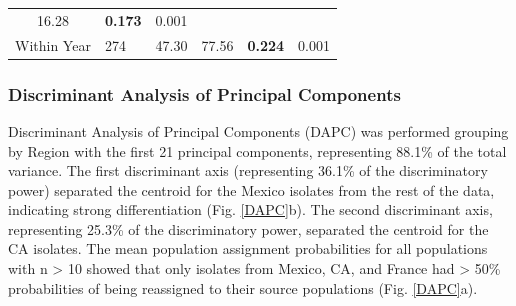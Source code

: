 \documentclass[fleqn,10pt,lineno]{wlpeerj} %
\theoremstyle{definition}
\theoremstyle{definition}
\theoremstyle{definition}
\theoremstyle{remark}
\begin{document}
\begin{longtable}[]{@{}clrllc@{}}
\begin{minipage}[t]{0.13\columnwidth}
16.28\strut
\end{minipage} & \begin{minipage}[t]{0.19\columnwidth}\raggedright\strut
\textbf{0.173}\strut
\end{minipage} & \begin{minipage}[t]{0.07\columnwidth}\centering\strut
0.001\strut
\end{minipage}\tabularnewline
\begin{minipage}[t]{0.32\columnwidth}\centering\strut
Within Year\strut
\end{minipage} & \begin{minipage}[t]{0.06\columnwidth}\raggedright\strut
274\strut
\end{minipage} & \begin{minipage}[t]{0.07\columnwidth}\raggedleft\strut
47.30\strut
\end{minipage} & \begin{minipage}[t]{0.13\columnwidth}\raggedright\strut
77.56\strut
\end{minipage} & \begin{minipage}[t]{0.19\columnwidth}\raggedright\strut
\textbf{0.224}\strut
\end{minipage} & \begin{minipage}[t]{0.07\columnwidth}\centering\strut
0.001\strut
\end{minipage}\tabularnewline
\bottomrule
\end{longtable}

\newpage

\subsubsection*{Discriminant Analysis of Principal
Components}\label{discriminant-analysis-of-principal-components}

Discriminant Analysis of Principal Components (DAPC) was performed
grouping by Region with the first 21 principal components, representing
88.1\% of the total variance. The first discriminant axis (representing
36.1\% of the discriminatory power) separated the centroid for the
Mexico isolates from the rest of the data, indicating strong
differentiation (Fig. \ref{DAPC}b). The second discriminant axis,
representing 25.3\% of the discriminatory power, separated the centroid
for the CA isolates. The mean population assignment probabilities for
all populations with n \textgreater{} 10 showed that only isolates from
Mexico, CA, and France had \textgreater{} 50\% probabilities of being
reassigned to their source populations (Fig. \ref{DAPC}a).
\end{document}

